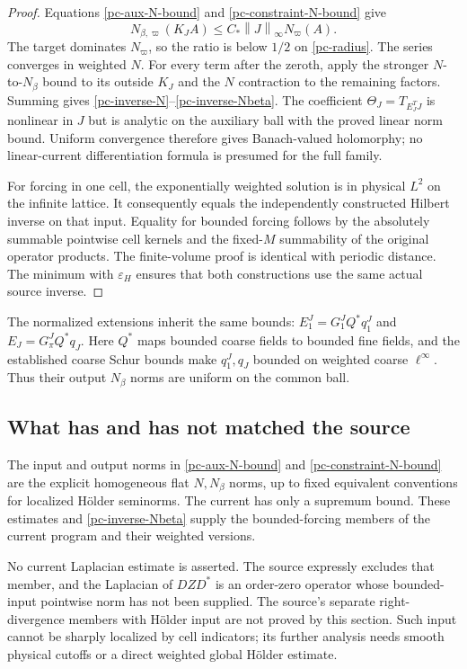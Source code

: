 \documentclass[11pt]{article}
\newcommand{\norm}[1]{\left\lVert#1\right\rVert}
\begin{document}
\begin{proof}
Equations \eqref{pc-aux-N-bound} and
\eqref{pc-constraint-N-bound} give
\[
 N_{\beta,\varpi}(K_JA)
          \le C_*\norm{J}_\infty N_\varpi(A).
\]
The target dominates $N_\varpi$, so the ratio is below $1/2$
on \eqref{pc-radius}. The series converges in weighted $N$.
For every term after the zeroth, apply the stronger $N$-to-$N_\beta$
bound to its outside $K_J$ and the $N$ contraction to the remaining
factors. Summing gives \eqref{pc-inverse-N}--\eqref{pc-inverse-Nbeta}.
The coefficient $\Theta_J=T_{E_J^TJ}$ is nonlinear in $J$ but is
analytic on the auxiliary ball with the proved linear norm bound.
Uniform convergence therefore gives Banach-valued holomorphy; no
linear-current differentiation formula is presumed for the full family.

For forcing in one cell, the exponentially weighted solution is in
physical $L^2$ on the infinite lattice. It consequently equals the
independently constructed Hilbert inverse on that input. Equality
for bounded forcing follows by the absolutely summable pointwise
cell kernels and the fixed-$M$ summability of the original operator
products. The finite-volume proof is identical with periodic
distance. The minimum with $\varepsilon_H$ ensures that both
constructions use the same actual source inverse.
\end{proof}

The normalized extensions inherit the same bounds:
$E_1^J=G_1^JQ^*q_1^J$ and $E_J=G_\pi^JQ^*q_J$.
Here $Q^*$ maps bounded coarse fields to bounded fine fields, and
the established coarse Schur bounds make $q_1^J,q_J$ bounded on
weighted coarse $\ell^\infty$. Thus their output $N_\beta$ norms
are uniform on the common ball.

\subsection{What has and has not matched the source}

The input and output norms in \eqref{pc-aux-N-bound} and
\eqref{pc-constraint-N-bound} are the explicit homogeneous flat
$N,N_\beta$ norms, up to fixed equivalent conventions for localized
H\"older seminorms. The current has only a supremum bound. These
estimates and \eqref{pc-inverse-Nbeta} supply the bounded-forcing
members of the current program and their weighted versions.

No current Laplacian estimate is asserted. The source expressly
excludes that member, and the Laplacian of $DZD^*$ is an order-zero
operator whose bounded-input pointwise norm has not been supplied.
The source's separate right-divergence members with H\"older input
are not proved by this section. Such input cannot be sharply
localized by cell indicators; its further analysis needs smooth
physical cutoffs or a direct weighted global H\"older estimate.
\end{document}
